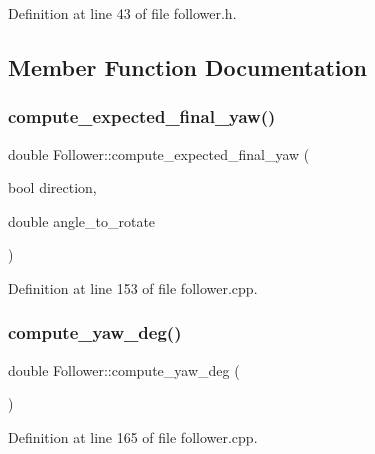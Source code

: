 Definition at line 43 of file follower.\+h.



\subsection{Member Function Documentation}
\mbox{\label{class_follower_a5573bec72ce4aed99706213154849b65}} 
\subsubsection{\texorpdfstring{compute\+\_\+expected\+\_\+final\+\_\+yaw()}{compute\_expected\_final\_yaw()}}
{\footnotesize\ttfamily double Follower\+::compute\+\_\+expected\+\_\+final\+\_\+yaw (\begin{DoxyParamCaption}\item[{bool}]{direction,  }\item[{double}]{angle\+\_\+to\+\_\+rotate }\end{DoxyParamCaption})}



Definition at line 153 of file follower.\+cpp.

\mbox{\label{class_follower_ac988cad87474cb64ef3be7fe197d90a7}} 
\subsubsection{\texorpdfstring{compute\+\_\+yaw\+\_\+deg()}{compute\_yaw\_deg()}}
{\footnotesize\ttfamily double Follower\+::compute\+\_\+yaw\+\_\+deg (\begin{DoxyParamCaption}{ }\end{DoxyParamCaption})}



Definition at line 165 of file follower.\+cpp.

\mbox{\label{class_follower_abde593631e6549062d77fb2169a17c66}} 
